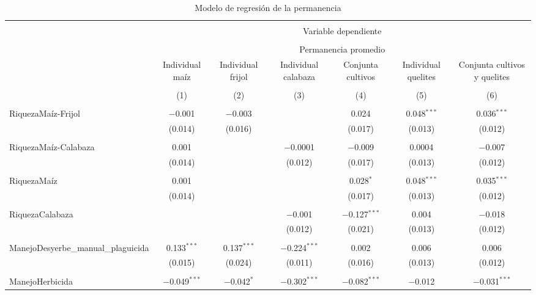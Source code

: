 \documentclass[spanish,11pt]{article}
\begin{document}
\begin{table}[!htbp] \centering 
  \caption{Modelo de regresión de la permanencia} 
  \label{hola} 
\begin{tabular}{@{\extracolsep{5pt}}lcccccc} 
\\[-1.8ex]\hline 
\hline \\[-1.8ex] 
 & \multicolumn{6}{c}{Variable dependiente} \\ 
\cline{2-7} 
\\[-1.8ex] & \multicolumn{6}{c}{Permanencia promedio} \\ 
 & Individual maíz & Individual frijol & Individual calabaza & Conjunta cultivos & Individual quelites & Conjunta cultivos y quelites \\ 
\\[-1.8ex] & (1) & (2) & (3) & (4) & (5) & (6)\\ 
\hline \\[-1.8ex] 
 RiquezaMaíz-Frijol & $-$0.001 & $-$0.003 &  & 0.024 & 0.048$^{***}$ & 0.036$^{***}$ \\ 
  & (0.014) & (0.016) &  & (0.017) & (0.013) & (0.012) \\ 
  & & & & & & \\ 
 RiquezaMaíz-Calabaza & 0.001 &  & $-$0.0001 & $-$0.009 & 0.0004 & $-$0.007 \\ 
  & (0.014) &  & (0.012) & (0.017) & (0.013) & (0.012) \\ 
  & & & & & & \\ 
 RiquezaMaíz & 0.001 &  &  & 0.028$^{*}$ & 0.048$^{***}$ & 0.035$^{***}$ \\ 
  & (0.014) &  &  & (0.017) & (0.013) & (0.012) \\ 
  & & & & & & \\ 
 RiquezaCalabaza &  &  & $-$0.001 & $-$0.127$^{***}$ & 0.004 & $-$0.018 \\ 
  &  &  & (0.012) & (0.021) & (0.013) & (0.012) \\ 
  & & & & & & \\ 
 ManejoDesyerbe\_manual\_plaguicida & 0.133$^{***}$ & 0.137$^{***}$ & $-$0.224$^{***}$ & 0.002 & 0.006 & 0.006 \\ 
  & (0.015) & (0.024) & (0.011) & (0.016) & (0.013) & (0.012) \\ 
  & & & & & & \\ 
 ManejoHerbicida & $-$0.049$^{***}$ & $-$0.042$^{*}$ & $-$0.302$^{***}$ & $-$0.082$^{***}$ & $-$0.012 & $-$0.031$^{***}$ \\ 

\end{tabular}
\end{table}
\end{document}

